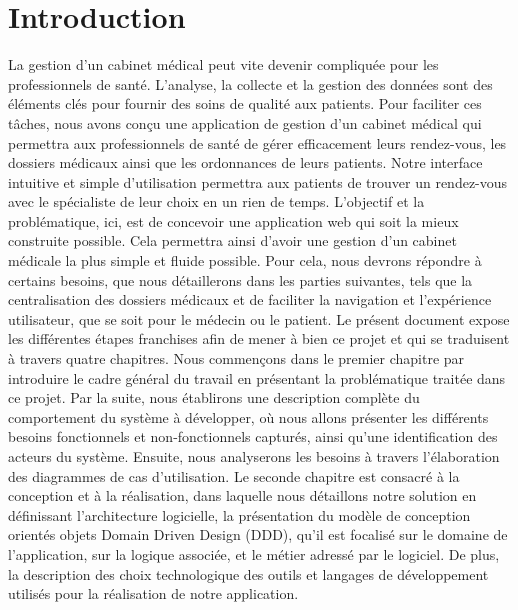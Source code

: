 \documentclass[a4paper]{report}
\begin{document}
\chapter{Introduction}

La gestion d'un cabinet médical peut vite devenir compliquée pour les professionnels de santé. L'analyse, la collecte et la gestion des données sont des éléments 
clés pour fournir des soins de qualité aux patients. Pour faciliter ces tâches, nous avons conçu une application de gestion d'un cabinet 
médical qui permettra aux professionnels de santé de gérer efficacement leurs rendez-vous, les dossiers médicaux ainsi que les ordonnances de leurs patients. 
Notre interface intuitive et simple d'utilisation permettra aux patients de trouver un rendez-vous avec le spécialiste de leur choix en un rien de temps. \newline\newline
L'objectif et la problématique, ici, est de concevoir une application web qui soit la mieux construite possible. Cela permettra ainsi d'avoir une gestion d'un cabinet 
médicale la plus simple et fluide possible. Pour cela, nous devrons répondre à certains besoins, que nous détaillerons dans les parties suivantes, tels que la centralisation des dossiers médicaux
et de faciliter la navigation et l'expérience utilisateur, que se soit pour le médecin ou le patient.\newline\newline
Le présent document expose les différentes étapes franchises afin de mener à bien ce projet et qui se traduisent à travers quatre chapitres.
Nous commençons dans le premier chapitre par introduire le cadre général du travail en présentant la problématique traitée dans ce projet. Par la suite, nous établirons une description complète du comportement du système à développer, où nous allons présenter les différents besoins fonctionnels et non-fonctionnels capturés, ainsi qu’une identification des acteurs du système. Ensuite, nous analyserons les besoins à travers l’élaboration des diagrammes de cas d’utilisation.\newline\newline
Le seconde chapitre est consacré à la conception et à la réalisation, dans laquelle nous détaillons notre solution en définissant l’architecture logicielle, la présentation du modèle de conception orientés objets Domain Driven Design (DDD), qu'il est focalisé sur le domaine de l'application, sur la logique associée, et le métier adressé par le logiciel. De plus, la description des choix technologique des outils et langages de développement utilisés pour la réalisation de notre application.\newline\newline
\end{document}
